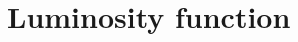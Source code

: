 \documentclass[a4paper,fleqn,usenatbib]{mnras}
\begin{document}


\section{Luminosity function}
\end{document}
